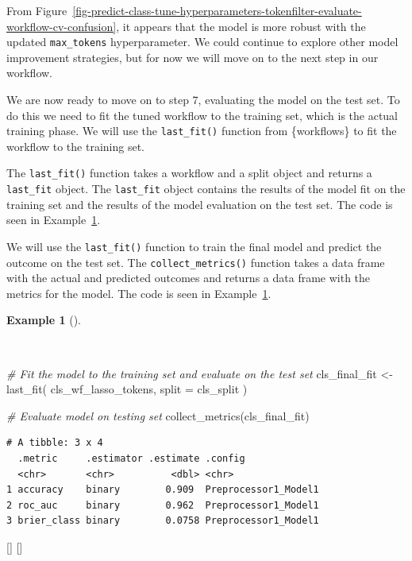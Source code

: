 \documentclass[
  letterpaper,
  krantz1]{latex/krantz-mod}
\newenvironment{Shaded}{\begin{snugshade}}{\end{snugshade}}
\newcommand{\AttributeTok}[1]{\textcolor[rgb]{0.00,0.00,0.00}{#1}}
\newcommand{\CommentTok}[1]{\textcolor[rgb]{0.00,0.00,0.00}{\textit{#1}}}
\newcommand{\FunctionTok}[1]{\textcolor[rgb]{0.00,0.00,0.00}{#1}}
\newcommand{\NormalTok}[1]{\textcolor[rgb]{0.00,0.00,0.00}{#1}}
\newcommand{\OtherTok}[1]{\textcolor[rgb]{0.00,0.00,0.00}{#1}}
\newcommand{\cindex}[1]{%
  \StrSubstitute{#1}{_}{\_}[\temp]%
  \index{\temp}%
}
\theoremstyle{definition}
\theoremstyle{definition}
\newtheorem{example}{Example}[chapter]
\theoremstyle{remark}
\begin{document}
From
Figure~\ref{fig-predict-class-tune-hyperparameters-tokenfilter-evaluate-workflow-cv-confusion},
it appears that the model is more robust with the updated
\texttt{max\_tokens} hyperparameter. We could continue to explore other
model improvement strategies, but for now we will move on to the next
step in our workflow.

We are now ready to move on to step 7, evaluating the model on the test
set. To do this we need to fit the tuned
workflow to the training set, which is the actual training phase. We
will use the \texttt{last\_fit()} function from \{workflows\} to fit the
workflow to the training set.

The \texttt{last\_fit()} function takes a workflow and a split object
and returns a \texttt{last\_fit} object. The \texttt{last\_fit} object
contains the results of the model fit on the training set and the
results of the model evaluation on the test set. The code is seen in
Example~\ref{exm-predict-class-tune-hyperparameters-evaluate-test}.

We will use the \texttt{last\_fit()} function to train the final model
and predict the outcome on the test set. The \texttt{collect\_metrics()}
function takes a data frame with the actual and predicted outcomes and
returns a data frame with the metrics for the model. The code is seen in
Example~\ref{exm-predict-class-tune-hyperparameters-evaluate-test}.

\begin{example}[]\protect\hypertarget{exm-predict-class-tune-hyperparameters-evaluate-test}{}\label{exm-predict-class-tune-hyperparameters-evaluate-test}

~

\begin{Shaded}
\begin{Highlighting}[numbers=left,,]
\CommentTok{\# Fit the model to the training set and evaluate on the test set}
\NormalTok{cls\_final\_fit }\OtherTok{\textless{}{-}}
  \FunctionTok{last\_fit}\NormalTok{(}
\NormalTok{    cls\_wf\_lasso\_tokens,}
    \AttributeTok{split =}\NormalTok{ cls\_split}
\NormalTok{  )}

\CommentTok{\# Evaluate model on testing set}
\FunctionTok{collect\_metrics}\NormalTok{(cls\_final\_fit)}
\end{Highlighting}
\end{Shaded}

\begin{verbatim}
# A tibble: 3 x 4
  .metric     .estimator .estimate .config             
  <chr>       <chr>          <dbl> <chr>               
1 accuracy    binary        0.909  Preprocessor1_Model1
2 roc_auc     binary        0.962  Preprocessor1_Model1
3 brier_class binary        0.0758 Preprocessor1_Model1
\end{verbatim}

\cindex{last_fit()}\cindex{collect_metrics()}

\end{example}
\end{document}

